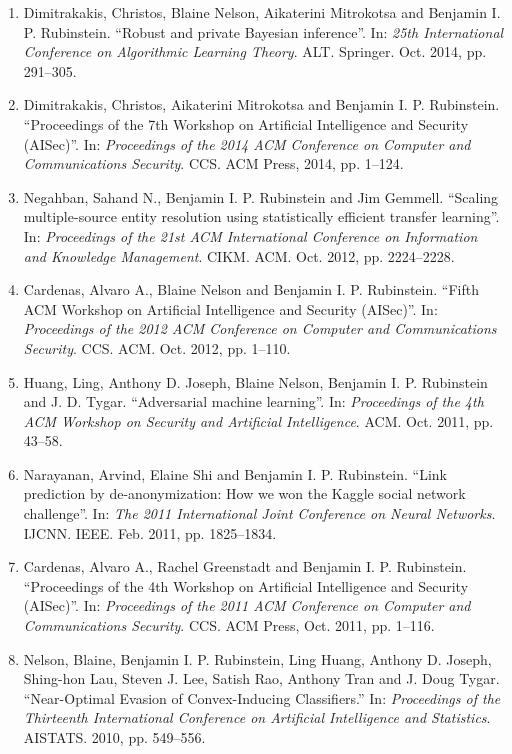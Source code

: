 \documentclass[a4paper,12pt]{article}
\begin{document}
\begin{enumerate}
\item Dimitrakakis, Christos, Blaine Nelson, Aikaterini Mitrokotsa and Benjamin I. P. Rubinstein.
``Robust and private Bayesian inference''.
In: 
\emph{25th International Conference on Algorithmic Learning Theory}.
ALT.
Springer.
Oct. 2014, pp. 291--305.

\item Dimitrakakis, Christos, Aikaterini Mitrokotsa and Benjamin I. P. Rubinstein.
``Proceedings of the 7th Workshop on Artificial Intelligence and Security (AISec)''.
In: 
\emph{Proceedings of the 2014 ACM Conference on Computer and Communications Security}.
CCS.
ACM Press, 2014, pp. 1--124.

\item Negahban, Sahand N., Benjamin I. P. Rubinstein and Jim Gemmell.
``Scaling multiple-source entity resolution using statistically efficient transfer learning''.
In: 
\emph{Proceedings of the 21st ACM International Conference on Information and Knowledge Management}.
CIKM.
ACM.
Oct. 2012, pp. 2224--2228.

\item Cardenas, Alvaro A., Blaine Nelson and Benjamin I. P. Rubinstein.
``Fifth ACM Workshop on Artificial Intelligence and Security (AISec)''.
In: 
\emph{Proceedings of the 2012 ACM Conference on Computer and Communications Security}.
CCS.
ACM.
Oct. 2012, pp. 1--110.

\item Huang, Ling, Anthony D. Joseph, Blaine Nelson, Benjamin I. P. Rubinstein and J. D. Tygar.
``Adversarial machine learning''.
In: 
\emph{Proceedings of the 4th ACM Workshop on Security and Artificial Intelligence}.
ACM.
Oct. 2011, pp. 43--58.

\item Narayanan, Arvind, Elaine Shi and Benjamin I. P. Rubinstein.
``Link prediction by de-anonymization: How we won the Kaggle social network challenge''.
In: 
\emph{The 2011 International Joint Conference on Neural Networks}.
IJCNN.
IEEE.
Feb. 2011, pp. 1825--1834.

\item Cardenas, Alvaro A., Rachel Greenstadt and Benjamin I. P. Rubinstein.
``Proceedings of the 4th Workshop on Artificial Intelligence and Security (AISec)''.
In: 
\emph{Proceedings of the 2011 ACM Conference on Computer and Communications Security}.
CCS.
ACM Press, Oct. 2011, pp. 1--116.

\item Nelson, Blaine, Benjamin I. P. Rubinstein, Ling Huang, Anthony D. Joseph, Shing-hon Lau, Steven J. Lee, Satish Rao, Anthony Tran and J. Doug Tygar.
``Near-Optimal Evasion of Convex-Inducing Classifiers.''
In: 
\emph{Proceedings of the Thirteenth International Conference on Artificial Intelligence and Statistics}.
AISTATS.
2010, pp. 549--556.


\end{enumerate}
\end{document}
